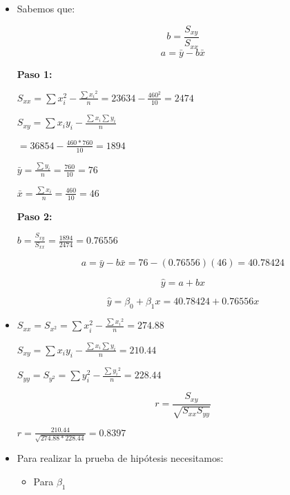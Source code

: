 \documentclass{../oxmathproblems}
\begin{document}
\begin{questions}


\miquestion 
\begin{itemize}
\item 
Sabemos que: 


$$ b = \frac{S_{xy}}{S_{xx}} $$   
$$a = \bar{y} - b\bar{x}$$


\textbf {Paso 1: }

$ S_{xx} = \sum{x_i^2} - \frac{\sum{x_i}^2}{n} = 23 634 - \frac{460^2}{10} = 2474$

$ S_{xy} = \sum{x_iy_i} - \frac{\sum{x_i}\sum{y_i}}{n} $

$ = 36 854 - \frac{460*760}{10} = 1894 $ 


$ \bar{y} = \frac{\sum{y_i}}{n} = \frac{760}{10} = 76 $ 

$  \bar{x} = \frac{\sum{x_i}}{n} = \frac{460}{10} = 46$ 


\textbf {Paso 2: }

$ b = \frac{S_{xy}}{S_{xx}}  = \frac{1894}{2474} = 0.76556 $


$$a = \bar{y} - b\bar{x} = 76 - (0.76556)(46) = 40.78424 $$



$$ \hat{y} = a + bx $$  

 
$$ \hat{y} = \beta_0 + \beta_1x = 40.78424 + 0.76556x$$ 
\item 
{}

$ S_{xx} =S_{x^2}  = \sum{x_i^2} - \frac{\sum{x_i}^2}{n} = 274.88$  

$ S_{xy} = \sum{x_iy_i} - \frac{\sum{x_i}\sum{y_i}}{n} = 210.44 $

$ S_{yy}  = S_{y^2}= \sum{y_i^2} - \frac{\sum{y_i}^2}{n} = 228.44$  



$$ r = \frac{S_{xy}}{ \sqrt{S_{xx}S_{yy}}}$$ 


$r = \frac{210.44}{\sqrt{274.88*228.44}} = 0.8397 $ 



\item Para realizar la prueba de hipótesis necesitamos: 
\begin{itemize}
\item Para $\beta_1$ 



\end{itemize}
\end{itemize}
\end{questions}
\end{document}
